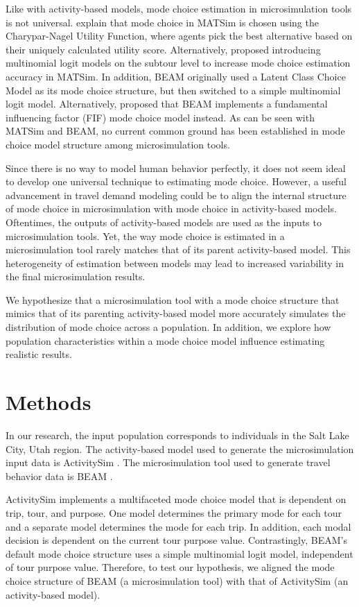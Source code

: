\documentclass[]{elsarticle} %
\begin{document}
Like with activity-based models, mode choice estimation in microsimulation tools is not universal. \citet{w2016multi} explain that mode choice in MATSim is chosen using the Charypar-Nagel Utility Function, where agents pick the best alternative based on their uniquely calculated utility score. Alternatively, \citet{ciari2008new} proposed introducing multinomial logit models on the subtour level to increase mode choice estimation accuracy in MATSim. In addition, BEAM originally used a Latent Class Choice Model as its mode choice structure, but then switched to a simple multinomial logit model. Alternatively, \citet{barth2020evaluating} proposed that BEAM implements a fundamental influencing factor (FIF) mode choice model instead. As can be seen with MATSim and BEAM, no current common ground has been established in mode choice model structure among microsimulation tools.

Since there is no way to model human behavior perfectly, it does not seem ideal to develop one universal technique to estimating mode choice. However, a useful advancement in travel demand modeling could be to align the internal structure of mode choice in microsimulation with mode choice in activity-based models. Oftentimes, the outputs of activity-based models are used as the inputs to microsimulation tools. Yet, the way mode choice is estimated in a microsimulation tool rarely matches that of its parent activity-based model. This heterogeneity of estimation between models may lead to increased variability in the final microsimulation results.

We hypothesize that a microsimulation tool with a mode choice structure that mimics that of its parenting activity-based model more accurately simulates the distribution of mode choice across a population. In addition, we explore how population characteristics within a mode choice model influence estimating realistic results.

\hypertarget{methods}{%
\section{Methods}\label{methods}}

In our research, the input population corresponds to individuals in the Salt Lake City, Utah region. The activity-based model used to generate the microsimulation input data is ActivitySim \citep{activitysim}. The microsimulation tool used to generate travel behavior data is BEAM \citep{beam}.

ActivitySim implements a multifaceted mode choice model that is dependent on trip, tour, and purpose. One model determines the primary mode for each tour and a separate model determines the mode for each trip. In addition, each modal decision is dependent on the current tour purpose value. Contrastingly, BEAM's default mode choice structure uses a simple multinomial logit model, independent of tour purpose value. Therefore, to test our hypothesis, we aligned the mode choice structure of BEAM (a microsimulation tool) with that of ActivitySim (an activity-based model).
\end{document}

